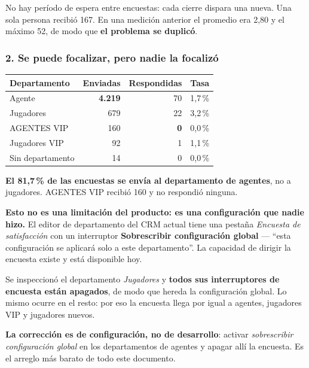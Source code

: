 \documentclass[11pt,a4paper]{article}
\begin{document}
No hay período de espera entre encuestas: cada cierre dispara una nueva. Una sola persona
recibió 167. En una medición anterior el promedio era 2,80 y el máximo 52, de modo que
\textbf{el problema se duplicó}.

\subsubsection*{2. Se puede focalizar, pero nadie la focalizó}

\begin{center}
\begin{tabularx}{\textwidth}{@{}Lrrr@{}}
\toprule
\textbf{Departamento} & \textbf{Enviadas} & \textbf{Respondidas} & \textbf{Tasa} \\
\midrule
Agente         & \textbf{4.219} & 70 & 1,7\,\% \\
Jugadores      & 679            & 22 & 3,2\,\% \\
AGENTES VIP    & 160            & \textbf{0} & 0,0\,\% \\
Jugadores VIP  & 92             & 1  & 1,1\,\% \\
Sin departamento & 14           & 0  & 0,0\,\% \\
\bottomrule
\end{tabularx}
\end{center}

\textbf{El 81,7\,\% de las encuestas se envía al departamento de agentes}, no a
jugadores. AGENTES VIP recibió 160 y no respondió ninguna.

\begin{alerta}
\textbf{Esto no es una limitación del producto: es una configuración que nadie hizo.} El
editor de departamento del CRM actual tiene una pestaña \emph{Encuesta de satisfacción}
con un interruptor \textbf{Sobrescribir configuración global} --- ``esta configuración se
aplicará solo a este departamento''. La capacidad de dirigir la encuesta existe y está
disponible hoy.

\vspace{0.4em}
Se inspeccionó el departamento \emph{Jugadores} y \textbf{todos sus interruptores de
encuesta están apagados}, de modo que hereda la configuración global. Lo mismo ocurre en
el resto: por eso la encuesta llega por igual a agentes, jugadores VIP y jugadores
nuevos.

\vspace{0.4em}
\textbf{La corrección es de configuración, no de desarrollo}: activar \emph{sobrescribir
configuración global} en los departamentos de agentes y apagar allí la encuesta. Es el
arreglo más barato de todo este documento.
\end{alerta}
\end{document}
